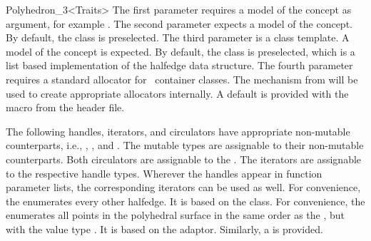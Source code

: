 \begin{ccRefClass}{Polyhedron_3<Traits>}
The first parameter requires a model of the 
concept as argument, for example .  The
second parameter expects a model of the 
concept.  By default, the class  is
preselected. The third parameter is a class template. A model of the
 concept is expected. By default, the class
 is preselected, which is a list based
implementation of the halfedge data structure.
The fourth parameter  requires a standard allocator for 
\stl\ container classes. The   mechanism from 
will be used to create appropriate allocators internally. A default is
provided with the macro  from the
 header file.

\ccTypes


\ccGlue
{}
\ccGlue
{}

\ccGlue
{}
\ccGlue
{}
\ccGlue
{}
\ccGlue
{}

\ccGlue
{}
\ccGlue
{}

\ccGlue
{}


The following handles, iterators, and circulators have appropriate
non-mutable counterparts, i.e., ,
, and . The mutable types are
assignable to their non-mutable counterparts.  Both circulators are
assignable to the . The iterators are
assignable to the respective handle types. Wherever the handles appear
in function parameter lists, the corresponding iterators can be used as
well. For convenience, the  enumerates every other 
halfedge. It is based on the  class. For
convenience, the  enumerates all points in the polyhedral
surface in the same order as the , but with the 
value type . It is based on the  
adaptor. Similarly, a  is provided.


\end{ccRefClass}
